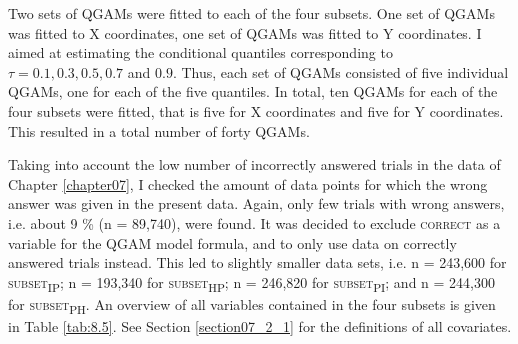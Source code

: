 Two sets of QGAMs were fitted to each of the four subsets. One set of QGAMs was fitted to X coordinates, one set of QGAMs was fitted to Y coordinates. I aimed at estimating the conditional quantiles corresponding to $\tau=0.1,0.3,0.5,0.7$ and $0.9$. Thus, each set of QGAMs consisted of five individual QGAMs, one for each of the five quantiles. In total, ten QGAMs for each of the four subsets were fitted, that is five for X coordinates and five for Y coordinates. This resulted in a total number of forty QGAMs.

Taking into account the low number of incorrectly answered trials in the data of Chapter \ref{chapter07}, I checked the amount of data points for which the wrong answer was given in the present data. Again, only few trials with wrong answers, i.e. about 9 \% (n = 89,740), were found. It was decided to exclude \textsc{correct} as a variable for the QGAM model formula, and to only use data on correctly answered trials instead. This led to slightly smaller data sets, i.e. n = 243,600 for \textsc{subset\textsubscript{IP}}; n = 193,340 for \textsc{subset\textsubscript{HP}}; n = 246,820 for \textsc{subset\textsubscript{PI}}; and n = 244,300 for \textsc{subset\textsubscript{PH}}. An overview of all variables contained in the four subsets is given in Table \ref{tab:8.5}. See Section \ref{section07_2_1} for the definitions of all covariates.

